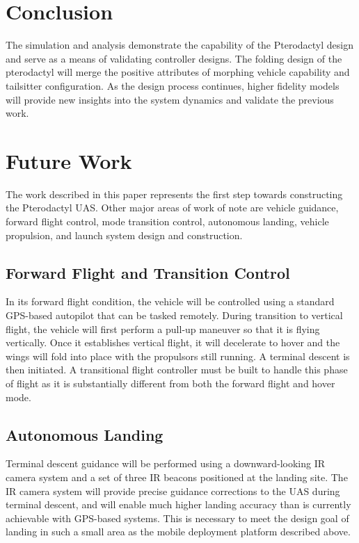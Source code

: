 \documentclass[]{aiaa-tc}%
\begin{document}
\section{Conclusion}

The simulation and analysis demonstrate the capability of the Pterodactyl design and serve as a means of validating controller designs. The folding design of the pterodactyl will merge the positive attributes of morphing vehicle capability and tailsitter configuration. As the design process continues, higher fidelity models will provide new insights into the system dynamics and validate the previous work.

\section{Future Work}

The work described in this paper represents the first step towards constructing the Pterodactyl UAS. Other major areas of work of note are vehicle guidance, forward flight control, mode transition control, autonomous landing, vehicle propulsion, and launch system design and construction.

\subsection{Forward Flight and Transition Control}

In its forward flight condition, the vehicle will be controlled using a standard GPS-based autopilot that can be tasked remotely. During transition to vertical flight, the vehicle will first perform a pull-up maneuver so that it is flying vertically. Once it establishes vertical flight, it will decelerate to hover and the wings will fold into place with the propulsors still running. A terminal descent is then initiated. A transitional flight controller must be built to handle this phase of flight as it is substantially different from both the forward flight and hover mode.

\subsection{Autonomous Landing}

Terminal descent guidance will be performed using a downward-looking IR camera system and a set of three IR beacons positioned at the landing site. The IR camera system will provide precise guidance corrections to the UAS during terminal descent, and will enable much higher landing accuracy than is currently achievable with GPS-based systems. This is necessary to meet the design goal of landing in such a small area as the mobile deployment platform described above.
\end{document}

